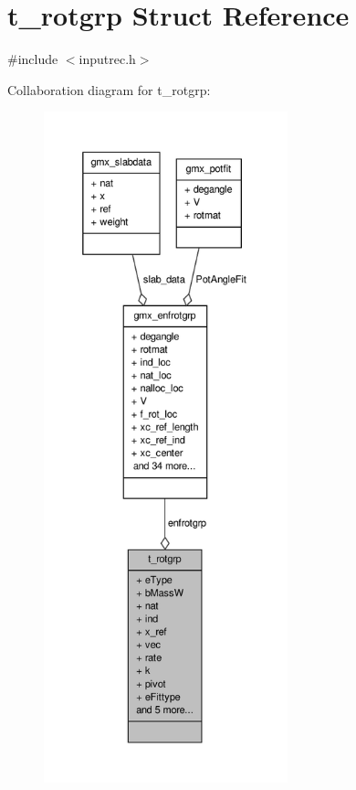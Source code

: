 \hypertarget{structt__rotgrp}{\section{t\-\_\-rotgrp \-Struct \-Reference}
\label{structt__rotgrp}
}


{\ttfamily \#include $<$inputrec.\-h$>$}



\-Collaboration diagram for t\-\_\-rotgrp\-:
\nopagebreak
\begin{figure}[H]
\begin{center}
\leavevmode
\includegraphics[height=550pt]{structt__rotgrp__coll__graph}
\end{center}
\end{figure}

